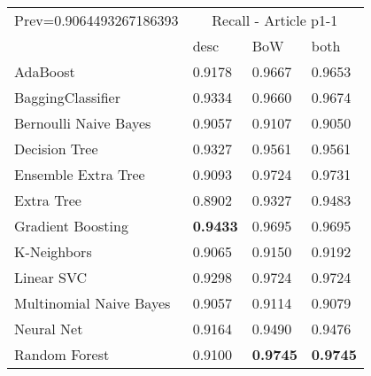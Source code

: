\begin{tabular}{|l|l|l|l| }
\hline
Prev=0.9064493267186393 &  \multicolumn{3}{c|}{Recall - Article p1-1} \\
\cline{2-4} & desc & BoW & both \\ \hline
AdaBoost                & 0.9178 & 0.9667 & 0.9653\\
BaggingClassifier       & 0.9334 & 0.9660 & 0.9674\\
Bernoulli Naive Bayes   & 0.9057 & 0.9107 & 0.9050\\
Decision Tree           & 0.9327 & 0.9561 & 0.9561\\
Ensemble Extra Tree     & 0.9093 & 0.9724 & 0.9731\\
Extra Tree              & 0.8902 & 0.9327 & 0.9483\\
Gradient Boosting       & {\bf 0.9433} & 0.9695 & 0.9695\\
K-Neighbors             & 0.9065 & 0.9150 & 0.9192\\
Linear SVC              & 0.9298 & 0.9724 & 0.9724\\
Multinomial Naive Bayes & 0.9057 & 0.9114 & 0.9079\\
Neural Net              & 0.9164 & 0.9490 & 0.9476\\
Random Forest           & 0.9100 & {\bf 0.9745} & {\bf 0.9745}\\
\hline
\end{tabular}
